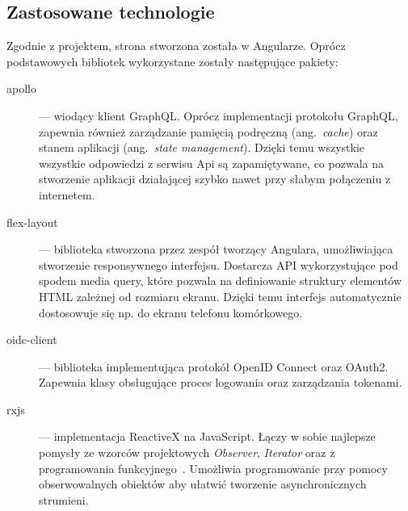 	\subsection{Zastosowane technologie}
		Zgodnie z projektem, strona stworzona została w Angularze.
		Oprócz podstawowych bibliotek wykorzystane zostały następujące pakiety:
		\begin{description}
			\item[apollo] --- wiodący klient GraphQL. Oprócz implementacji protokołu GraphQL,
				zapewnia również zarządzanie pamięcią podręczną (ang.\ \emph{cache}) oraz stanem aplikacji (ang.\ \emph{state management}).
				Dzięki temu wszystkie wszystkie odpowiedzi z serwisu Api są zapamiętywane,
				co pozwala na stworzenie aplikacji działającej szybko nawet przy słabym połączeniu z internetem.
			
			\item[flex-layout] --- biblioteka stworzona przez zespół tworzący Angulara, umożliwiająca stworzenie responsywnego interfejsu.
				Dostarcza API wykorzystujące pod spodem media query, które pozwala na definiowanie struktury elementów HTML zależnej od rozmiaru ekranu.
				Dzięki temu interfejs automatycznie dostosowuje się np. do ekranu telefonu komórkowego.
			
			\item[oidc-client] --- biblioteka implementująca protokół OpenID Connect oraz OAuth2.
				Zapewnia klasy obsługujące proces logowania oraz zarządzania tokenami.

			\item[rxjs] --- implementacja ReactiveX na JavaScript.
				Łączy w sobie najlepsze pomysły ze wzorców projektowych \emph{Observer}, \emph{Iterator} oraz z programowania funkcyjnego~\cite{reactiveX}.
				Umożliwia programowanie przy pomocy obserwowalnych obiektów aby ułatwić tworzenie asynchronicznych strumieni.
		\end{description}

